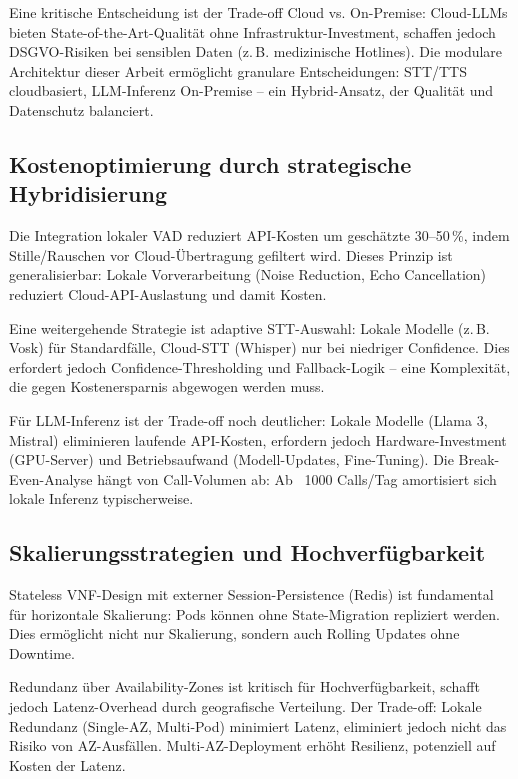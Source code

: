 Eine kritische Entscheidung ist der Trade-off Cloud vs. On-Premise: Cloud-\acrshort{LLM}s bieten State-of-the-Art-Qualität ohne Infrastruktur-Investment, schaffen jedoch \acrshort{DSGVO}-Risiken bei sensiblen Daten (z.\,B. medizinische Hotlines). Die modulare Architektur dieser Arbeit ermöglicht granulare Entscheidungen: \acrshort{STT}/\acrshort{TTS} cloudbasiert, \acrshort{LLM}-Inferenz On-Premise -- ein Hybrid-Ansatz, der Qualität und Datenschutz balanciert.

\subsection{Kostenoptimierung durch strategische Hybridisierung}

Die Integration lokaler \acrshort{VAD} reduziert \acrshort{API}-Kosten um geschätzte 30--50\,\%, indem Stille/Rauschen vor Cloud-Übertragung gefiltert wird. Dieses Prinzip ist generalisierbar: Lokale Vorverarbeitung (Noise Reduction, Echo Cancellation) reduziert Cloud-\acrshort{API}-Auslastung und damit Kosten.

Eine weitergehende Strategie ist adaptive \acrshort{STT}-Auswahl: Lokale Modelle (z.\,B. \acrshort{Vosk}) für Standardfälle, Cloud-\acrshort{STT} (Whisper) nur bei niedriger Confidence. Dies erfordert jedoch Confidence-Thresholding und Fallback-Logik -- eine Komplexität, die gegen Kostenersparnis abgewogen werden muss.

Für \acrshort{LLM}-Inferenz ist der Trade-off noch deutlicher: Lokale Modelle (Llama 3, Mistral) eliminieren laufende \acrshort{API}-Kosten, erfordern jedoch Hardware-Investment (GPU-Server) und Betriebsaufwand (Modell-Updates, Fine-Tuning). Die Break-Even-Analyse hängt von Call-Volumen ab: Ab ~1000 Calls/Tag amortisiert sich lokale Inferenz typischerweise.

\subsection{Skalierungsstrategien und Hochverfügbarkeit}

Stateless \acrshort{VNF}-Design mit externer Session-Persistence (Redis) ist fundamental für horizontale Skalierung: Pods können ohne State-Migration repliziert werden. Dies ermöglicht nicht nur Skalierung, sondern auch Rolling Updates ohne Downtime.

Redundanz über Availability-Zones ist kritisch für Hochverfügbarkeit, schafft jedoch Latenz-Overhead durch geografische Verteilung. Der Trade-off: Lokale Redundanz (Single-AZ, Multi-Pod) minimiert Latenz, eliminiert jedoch nicht das Risiko von AZ-Ausfällen. Multi-AZ-Deployment erhöht Resilienz, potenziell auf Kosten der Latenz.

